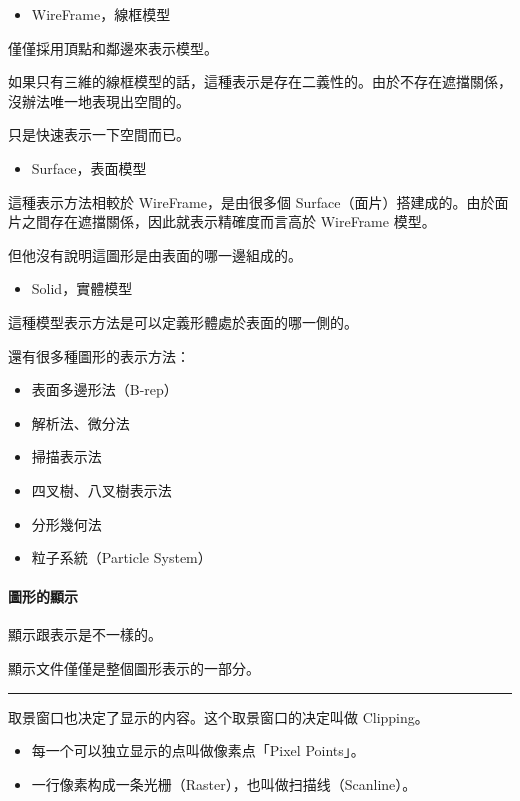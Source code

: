 \documentclass[
]{article}
\begin{document}
\begin{itemize}
\item
  WireFrame，線框模型
\end{itemize}

僅僅採用頂點和鄰邊來表示模型。

如果只有三維的線框模型的話，這種表示是存在二義性的。由於不存在遮擋關係，沒辦法唯一地表現出空間的。

只是快速表示一下空間而已。

\begin{itemize}
\item
  Surface，表面模型
\end{itemize}

這種表示方法相較於 WireFrame，是由很多個
Surface（面片）搭建成的。由於面片之間存在遮擋關係，因此就表示精確度而言高於
WireFrame 模型。

但他沒有說明這圖形是由表面的哪一邊組成的。

\begin{itemize}
\item
  Solid，實體模型
\end{itemize}

這種模型表示方法是可以定義形體處於表面的哪一側的。

還有很多種圖形的表示方法：

\begin{itemize}
\item
  表面多邊形法（B-rep）
\item
  解析法、微分法
\item
  掃描表示法
\item
  四叉樹、八叉樹表示法
\item
  分形幾何法
\item
  粒子系統（Particle System）
\end{itemize}

\hypertarget{header-n125}{%
\paragraph{圖形的顯示}\label{header-n125}}

顯示跟表示是不一樣的。

顯示文件僅僅是整個圖形表示的一部分。

\begin{center}\rule{0.5\linewidth}{\linethickness}\end{center}

取景窗口也决定了显示的内容。这个取景窗口的决定叫做 Clipping。

\begin{itemize}
\item
  每一个可以独立显示的点叫做像素点「Pixel Points」。
\item
  一行像素构成一条光栅（Raster），也叫做扫描线（Scanline）。
\end{itemize}
\end{document}

